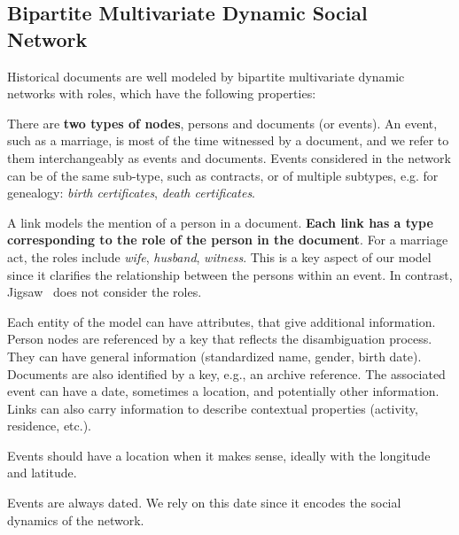 \subsection{Bipartite Multivariate Dynamic Social Network}

Historical documents are well modeled by bipartite multivariate dynamic networks with roles, which have the following properties:
\begin{description}[nosep,leftmargin=2mm]
    \item[{Bipartite:}] There are \textbf{two types of nodes}, persons and documents (or events). An event, such as a marriage, is most of the time witnessed by a document, and we refer to them interchangeably as events and documents. Events considered in the network can be of the same sub-type, such as contracts, or of multiple subtypes, e.g. for genealogy: \emph{birth certificates}, \emph{death certificates}.
    \item[Links and Roles:] A link models the mention of a person in a document. \textbf{Each link has a type corresponding to the role of the person in the document}. For a marriage act, the roles include \emph{wife}, \emph{husband}, \emph{witness}. This is a key aspect of our model since it clarifies the relationship between the persons within an event. In contrast, Jigsaw~\cite{staskoJigsawSupportingInvestigative2008} does not consider the roles.
    \item[{Multivariate:}] Each entity of the model can have attributes, that give additional information. Person nodes are referenced by a key that reflects the disambiguation process. They can have general information (standardized name, gender, birth date). Documents are also identified by a key, e.g., an archive reference. The associated event can have a date, sometimes a location, and potentially other information. Links can also carry information to describe contextual properties (activity, residence, etc.).
    \item[{Geolocated:}] Events should have a location when it makes sense, ideally with the longitude and latitude.
    \item[{Dynamic:}] Events are always dated. We rely on this date since it encodes the social dynamics of the network.
\end{description}

